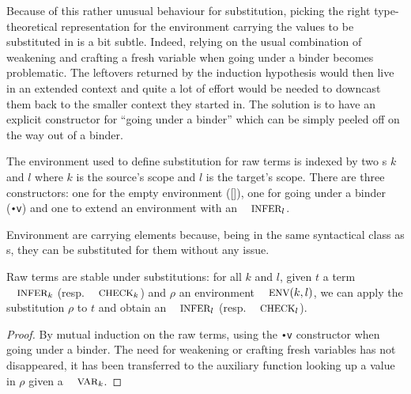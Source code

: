 \documentclass[a4paper,UKenglish]{lipics-v2016}
\begin{document}
Because of this rather unusual behaviour for substitution, picking
the right type-theoretical representation for the environment
carrying the values to be substituted in is a bit subtle. Indeed,
relying on the usual combination of weakening and crafting a fresh
variable when going under a binder becomes problematic. The leftovers
returned by the induction hypothesis would then live in an extended
context and quite a lot of effort would be needed to downcast them
back to the smaller context they started in. The solution is to have
an explicit constructor for ``going under a binder'' which can be
simply peeled off on the way out of a binder. 

\begin{definition}The environment \Env{} used to define substitution
for raw terms is indexed by two \Nat{}s $k$ and $l$ where $k$ is the
source's scope and $l$ is the target's scope. There are three constructors:
one for the empty environment ([]), one for going under a binder (\texttt{∙v})
and one to extend an environment with an $\Inferable{}_l$.
\end{definition}

Environment are carrying \Inferable{} elements because, being in the
same syntactical class as \Var{}s, they can be substituted for them
without any issue.

\begin{lemma}Raw terms are stable under substitutions: for all $k$ and
$l$, given $t$ a term $\Inferable{}_k$ (resp. $\Checkable{}_k$) and $ρ$
an environment $\Env{}(k,l)$, we can apply the substitution $ρ$ to $t$
and obtain an $\Inferable{}_l$ (resp. $\Checkable{}_l$).
\end{lemma}
\begin{proof}By mutual induction on the raw terms, using the \texttt{∙v}
\Env{} constructor when going under a binder. The need for weakening or
crafting fresh variables has not disappeared, it has been transferred to
the auxiliary function looking up a value in $ρ$ given a $\Var{}_k$.
\end{proof}
\end{document}
